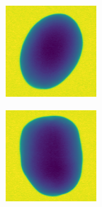 \documentclass[11pt]{article}
\begin{document}
\begin{figure}[!h]
\begin{subfigure}[b]{0.22\textwidth}
         \caption{}
         \label{fig:perfect_13}
     \end{subfigure}
     \hfill
     \begin{subfigure}[b]{0.22\textwidth}
         \centering
         \includegraphics[width=\textwidth]{figurer/potato_dataset/perfect/perfect_14.jpg}
         \caption{}
         \label{fig:perfect_14}
     \end{subfigure}
     \hfill
     \begin{subfigure}[b]{0.22\textwidth}
         \centering
         \includegraphics[width=\textwidth]{figurer/potato_dataset/perfect/perfect_15.jpg}

\end{subfigure}
\end{figure}
\end{document}
